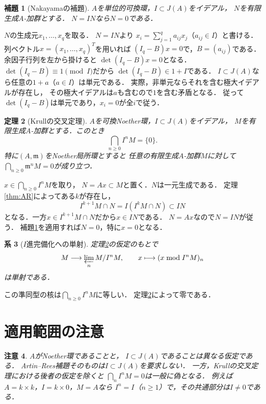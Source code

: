 \documentclass[a5paper,10pt,onecolumn]{jsarticle}
\makeatletter
\theoremstyle{mathnotetheorem}
\newtheorem{theorem}{定理}[section]
\newtheorem{lemma}[theorem]{補題}
\newtheorem{corollary}[theorem]{系}
\newtheorem{remark}[theorem]{注意}
\renewcommand{\proofname}{証明}
\renewenvironment{proof}[1][\proofname]{%
  \par\pushQED{\qed}\normalfont\topsep4\p@\@plus2\p@\relax
  \trivlist\item[\hskip\labelsep\bfseries #1]\ignorespaces
}{\popQED\endtrivlist\@endpefalse}
\makeatother
\begin{document}
\begin{lemma}[Nakayamaの補題]\label{lem:nakayama}
$A$を単位的可換環，$I\subset J(A)$をイデアル，
$N$を有限生成$A$-加群とする．
$N=IN$なら$N=0$である．
\end{lemma}
\begin{proof}
$N$の生成元$x_1,\ldots,x_q$を取る．
$N=IN$より
$x_i=\sum_{j=1}^q a_{ij}x_j$（$a_{ij}\in I$）と書ける．
列ベクトル$x=(x_1,\ldots,x_q)^T$を用いれば
$(I_q-B)x=0$で，$B=(a_{ij})$である．
余因子行列を左から掛けると
$\det(I_q-B)x=0$となる．
$\det(I_q-B)\equiv1\pmod I$だから
$\det(I_q-B)\in1+I$である．
$I\subset J(A)$なら任意の$1+a$（$a\in I$）は単元である．
実際，非単元ならそれを含む極大イデアルが存在し，
その極大イデアルは$a$も含むので$1$を含む矛盾となる．
従って$\det(I_q-B)$は単元であり，$x_i=0$が全$i$で従う．
\end{proof}

\begin{theorem}[Krullの交叉定理]\label{thm:krull}
$A$を可換Noether環，$I\subset J(A)$をイデアル，
$M$を有限生成$A$-加群とする．このとき
\[
 \bigcap_{n\ge0}I^nM=\{0\}.
\]
特に$(A,\mathfrak m)$をNoether局所環とすると
任意の有限生成$A$-加群$M$に対して
$\bigcap_{n\ge0}\mathfrak m^nM=0$が成り立つ．
\end{theorem}
\begin{proof}
$x\in\bigcap_{n\ge0}I^nM$を取り，
$N=Ax\subset M$と置く．$N$は一元生成である．
定理\ref{thm:AR}によってある$k$が存在し，
\[
 I^{k+1}M\cap N=I(I^kM\cap N)\subset IN
\]
となる．一方$x\in I^{k+1}M\cap N$だから$x\in IN$である．
$N=Ax$なので$N=IN$が従う．
補題\ref{lem:nakayama}を適用すれば$N=0$，特に$x=0$となる．
\end{proof}

\begin{corollary}[$I$進完備化への単射]\label{cor:injective}
定理\ref{thm:krull}の仮定のもとで
\[
 M\longrightarrow\varprojlim_n M/I^nM,\qquad
 x\longmapsto(x\bmod I^nM)_n
\]
は単射である．
\end{corollary}
\begin{proof}
この準同型の核は$\bigcap_{n\ge0}I^nM$に等しい．
定理\ref{thm:krull}によって零である．
\end{proof}

\section{適用範囲の注意}
\begin{remark}
$A$がNoether環であることと，
$I\subset J(A)$であることは異なる仮定である．
Artin--Rees補題そのものは$I\subset J(A)$を要求しない．
一方，Krullの交叉定理における後者の仮定を除くと
$\bigcap_n I^nM=0$は一般に偽となる．
例えば$A=k\times k$，$I=k\times0$，$M=A$なら
$I^n=I$（$n\ge1$）で，その共通部分は$I\ne0$である．
\end{remark}
\end{document}

